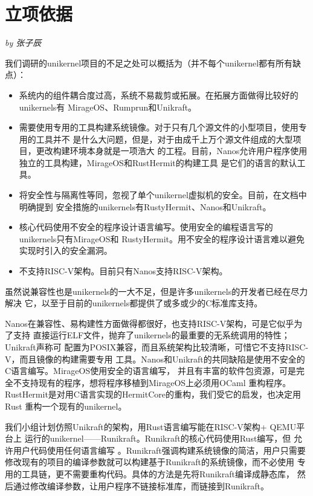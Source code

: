 \documentclass[UTF8,fontset=none,linespread=1.15]{ctexart}
\newcommand{\sectionauthor}[1]{%
\vspace*{-5ex}
\noindent\textrm{\hfill\textit{by #1}}
\vspace*{2ex}\par}
\begin{document}

\section{立项依据}\sectionauthor{张子辰}
我们调研的unikernel项目的不足之处可以概括为（并不每个unikernel都有所有缺点）：
\begin{itemize}
\item 系统内的组件耦合度过高，系统不易裁剪或拓展。在拓展方面做得比较好的unikernels有
MirageOS、Rumprun和Unikraft。
\item 需要使用专用的工具构建系统镜像。对于只有几个源文件的小型项目，使用专用的工具并不
是什么大问题，但是，对于由成千上万个源文件组成的大型项目，更改构建环境本身就是一项浩大
的工程。目前，Nanos允许用户程序使用独立的工具构建，MirageOS和RustHermit的构建工具
是它们的语言的默认工具。
\item 将安全性与隔离性等同，忽视了单个unikernel虚拟机的安全。目前，在文档中明确提到
安全措施的unikernels有RustyHermit、Nanos和Unikraft。
\item 核心代码使用不安全的程序设计语言编写。使用安全的编程语言写的unikernels只有MirageOS和
RustyHermit。用不安全的程序设计语言难以避免实现时引入的安全漏洞。
\item 不支持RISC-V架构。目前只有Nanos支持RISC-V架构。
\end{itemize}
虽然说兼容性也是unikernels的一大不足，但是许多unikernels的开发者已经在尽力解决
它，以至于目前的unikernels都提供了或多或少的C标准库支持。

Nanos在兼容性、易构建性方面做得都很好，也支持RISC-V架构，可是它似乎为了支持
直接运行ELF文件，抛弃了unikernels的最重要的无系统调用的特性；Unikraft声称可
配置为POSIX兼容，而且系统架构比较清晰，可惜它不支持RISC-V，而且镜像的构建需要专用
工具。Nanos和Unikraft的共同缺陷是使用不安全的C语言编写。MirageOS使用安全的语言编写，
并且有丰富的软件包资源，可是完全不支持现有的程序，想将程序移植到MirageOS上必须用OCaml
重构程序。RustHermit是对用C语言实现的HermitCore的重构，我们受它的启发，也决定用Rust
重构一个现有的unikernel。

我们小组计划仿照Unikraft的架构，用Rust语言编写能在RISC-V架构+ QEMU平台上
运行的unikernel——Runikraft。Runikraft的核心代码使用Rust编写，但
允许用户代码使用任何语言编写
。Runikraft强调构建系统镜像的简洁，用户只需要
修改现有的项目的编译参数就可以构建基于Runikraft的系统镜像，而不必使用
专用的工具链，更不需要重构代码。具体的方法是先将Runikraft编译成静态库，
然后通过修改编译参数，让用户程序不链接标准库，而链接到Runikraft。
\end{document}

